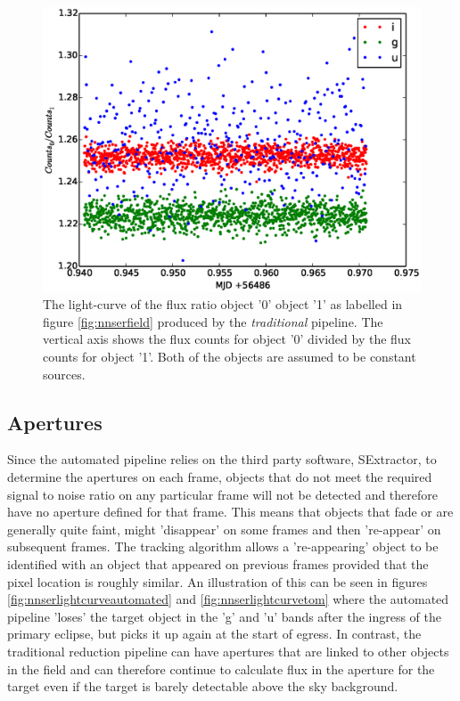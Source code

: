 \begin{figure}[!h]
\centering
\includegraphics[width=140mm]{images/differential_trad.eps}
\caption{The light-curve of the flux ratio object '0'  object '1' as labelled in figure \ref{fig:nnserfield} produced by the \emph{traditional} pipeline. The vertical axis shows the flux counts for object '0' divided by the flux counts for object '1'. Both of the objects are assumed to be constant sources. }
\label{fig:differentialtrad}
\end{figure}

\subsection{Apertures}
Since the automated pipeline relies on the third party software, SExtractor, to determine the apertures on each frame, objects that do not meet the required signal to noise ratio on any particular frame will not be detected and therefore have no aperture defined for that frame. This means that objects that fade or are generally quite faint, might 'disappear' on some frames and then 're-appear' on subsequent frames. The tracking algorithm allows a 're-appearing' object to be identified with an object that appeared on previous frames provided that the pixel location is roughly similar. An illustration of this can be seen in figures \ref{fig:nnserlightcurveautomated} and \ref{fig:nnserlightcurvetom} where the automated pipeline 'loses' the target object in the 'g' and 'u' bands after the ingress of the primary eclipse, but picks it up again at the start of egress. In contrast, the traditional reduction pipeline can have apertures that are linked to other objects in the field and can therefore continue to calculate flux in the aperture for the target even if the target is barely detectable above the sky background.

